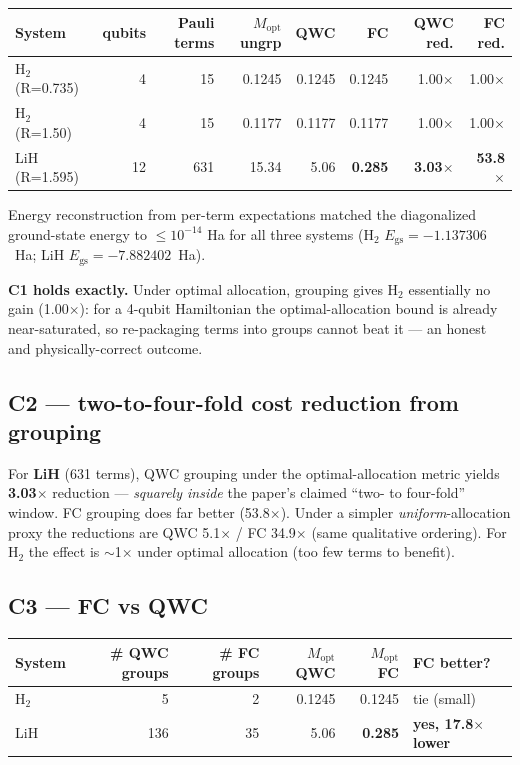 \documentclass[11pt]{article}
\begin{document}
\begin{center}
\begin{tabular}{lrrrrrrr}
\toprule
System & qubits & Pauli terms & $M_{\mathrm{opt}}$ ungrp & QWC & FC & QWC red. & FC red. \\
\midrule
H$_2$ (R=0.735) & 4 & 15 & 0.1245 & 0.1245 & 0.1245 & 1.00$\times$ & 1.00$\times$ \\
H$_2$ (R=1.50)  & 4 & 15 & 0.1177 & 0.1177 & 0.1177 & 1.00$\times$ & 1.00$\times$ \\
LiH (R=1.595)   & 12 & 631 & 15.34 & 5.06 & \textbf{0.285} & \textbf{3.03$\times$} & \textbf{53.8$\times$} \\
\bottomrule
\end{tabular}
\end{center}

Energy reconstruction from per-term expectations matched the diagonalized
ground-state energy to $\le 10^{-14}$ Ha for all three systems
(H$_2$ $E_{\mathrm{gs}}=-1.137306$~Ha; LiH $E_{\mathrm{gs}}=-7.882402$~Ha).

\textbf{C1 holds exactly.} Under optimal allocation, grouping gives H$_2$
essentially no gain (1.00$\times$): for a 4-qubit Hamiltonian the
optimal-allocation bound is already near-saturated, so re-packaging terms into
groups cannot beat it --- an honest and physically-correct outcome.

\subsection*{C2 --- two-to-four-fold cost reduction from grouping}

For \textbf{LiH} (631 terms), QWC grouping under the optimal-allocation metric
yields \textbf{3.03$\times$} reduction --- \emph{squarely inside} the paper's
claimed ``two- to four-fold'' window. FC grouping does far better
(53.8$\times$). Under a simpler \emph{uniform}-allocation proxy the reductions
are QWC 5.1$\times$ / FC 34.9$\times$ (same qualitative ordering). For H$_2$
the effect is $\sim$1$\times$ under optimal allocation (too few terms to
benefit).

\subsection*{C3 --- FC vs QWC}

\begin{center}
\begin{tabular}{lrrrrl}
\toprule
System & \# QWC groups & \# FC groups & $M_{\mathrm{opt}}$ QWC & $M_{\mathrm{opt}}$ FC & FC better? \\
\midrule
H$_2$ & 5   & 2  & 0.1245 & 0.1245 & tie (small) \\
LiH   & 136 & 35 & 5.06   & \textbf{0.285} & \textbf{yes, 17.8$\times$ lower} \\
\bottomrule
\end{tabular}
\end{center}
\end{document}
